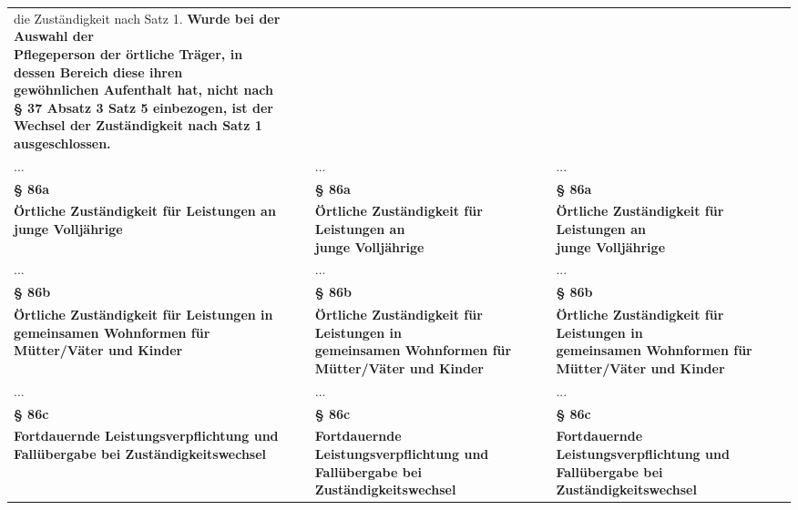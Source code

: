 \documentclass[10pt,a4paper,landscape]{article}
\begin{document}
\begin{longtable}{|L{8.2cm}|L{8.2cm}|L{8.2cm}|}
die Zuständigkeit  \newline nach Satz 1. \textbf{\textcolor{diffgreen}{Wurde bei der Auswahl der  \newline Pflegeperson der örtliche Träger, in  \newline dessen Bereich diese ihren  \newline gewöhnlichen Aufenthalt hat, nicht nach  \newline \S{} 37 Absatz 3 Satz 5 einbezogen, ist der  \newline Wechsel der Zuständigkeit nach Satz 1  \newline ausgeschlossen.}} \\
\hhline{|---|}
... & ... & ... \\
\hhline{|---|}
\textbf{\S{} 86a} & \textbf{\S{} 86a} & \textbf{\S{} 86a} \\
\hhline{|---|}
\textbf{Örtliche Zuständigkeit für Leistungen an  \newline junge Volljährige} & \textbf{Örtliche Zuständigkeit für Leistungen an  \newline junge Volljährige} & \textbf{Örtliche Zuständigkeit für Leistungen an  \newline junge Volljährige} \\
\hhline{|---|}
... & ... & ... \\
\hhline{|---|}
\textbf{\S{} 86b} & \textbf{\S{} 86b} & \textbf{\S{} 86b} \\
\hhline{|---|}
\textbf{Örtliche Zuständigkeit für Leistungen in  \newline gemeinsamen Wohnformen für  \newline Mütter/Väter und Kinder} & \textbf{Örtliche Zuständigkeit für Leistungen in  \newline gemeinsamen Wohnformen für  \newline Mütter/Väter und Kinder} & \textbf{Örtliche Zuständigkeit für Leistungen in  \newline gemeinsamen Wohnformen für  \newline Mütter/Väter und Kinder} \\
\hhline{|---|}
... & ... & ... \\
\hhline{|---|}
\textbf{\S{} 86c} & \textbf{\S{} 86c} & \textbf{\S{} 86c} \\
\hhline{|---|}
\textbf{Fortdauernde Leistungsverpflichtung und  \newline Fallübergabe bei Zuständigkeitswechsel} & \textbf{Fortdauernde Leistungsverpflichtung und  \newline Fallübergabe bei Zuständigkeitswechsel} & \textbf{Fortdauernde Leistungsverpflichtung und  \newline Fallübergabe bei Zuständigkeitswechsel} \\

\end{longtable}
\end{document}
